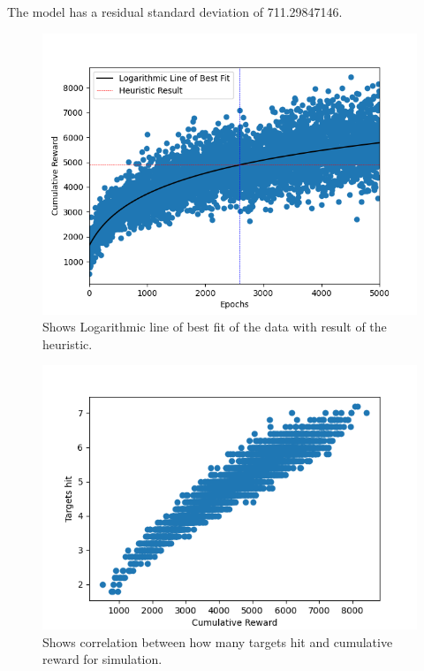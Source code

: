 The model has a residual standard deviation of 711.29847146. 
\begin{figure}
    \centering
    \includegraphics[width=\singlefigure]{figures/figure_2.png}
    \caption{\label{fig:fig1} Shows Logarithmic line of best fit of the data with result of the heuristic.}
\end{figure}

\begin{figure}
    \centering
    \includegraphics[width=\singlefigure]{figures/figure_3.png}
    \caption{\label{fig:fig2} Shows correlation between how many targets hit and cumulative reward for simulation.}
\end{figure}
